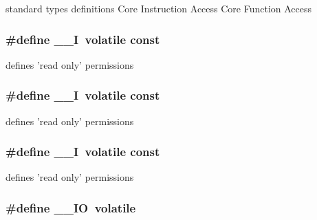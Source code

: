 standard types definitions Core Instruction Access Core Function Access \hypertarget{group___c_m_s_i_s__core__definitions_gaf63697ed9952cc71e1225efe205f6cd3}{
\subsubsection[{\-\_\-\-\_\-\-I}]{\setlength{\rightskip}{0pt plus 5cm}\#define \-\_\-\-\_\-\-I~volatile const}}\label{group___c_m_s_i_s__core__definitions_gaf63697ed9952cc71e1225efe205f6cd3}
defines 'read only' permissions \hypertarget{group___c_m_s_i_s__core__definitions_gaf63697ed9952cc71e1225efe205f6cd3}{
\subsubsection[{\-\_\-\-\_\-\-I}]{\setlength{\rightskip}{0pt plus 5cm}\#define \-\_\-\-\_\-\-I~volatile const}}\label{group___c_m_s_i_s__core__definitions_gaf63697ed9952cc71e1225efe205f6cd3}
defines 'read only' permissions \hypertarget{group___c_m_s_i_s__core__definitions_gaf63697ed9952cc71e1225efe205f6cd3}{
\subsubsection[{\-\_\-\-\_\-\-I}]{\setlength{\rightskip}{0pt plus 5cm}\#define \-\_\-\-\_\-\-I~volatile const}}\label{group___c_m_s_i_s__core__definitions_gaf63697ed9952cc71e1225efe205f6cd3}
defines 'read only' permissions \hypertarget{group___c_m_s_i_s__core__definitions_gaec43007d9998a0a0e01faede4133d6be}{
\subsubsection[{\-\_\-\-\_\-\-I\-O}]{\setlength{\rightskip}{0pt plus 5cm}\#define \-\_\-\-\_\-\-I\-O~volatile}}\label{group___c_m_s_i_s__core__definitions_gaec43007d9998a0a0e01faede4133d6be}

